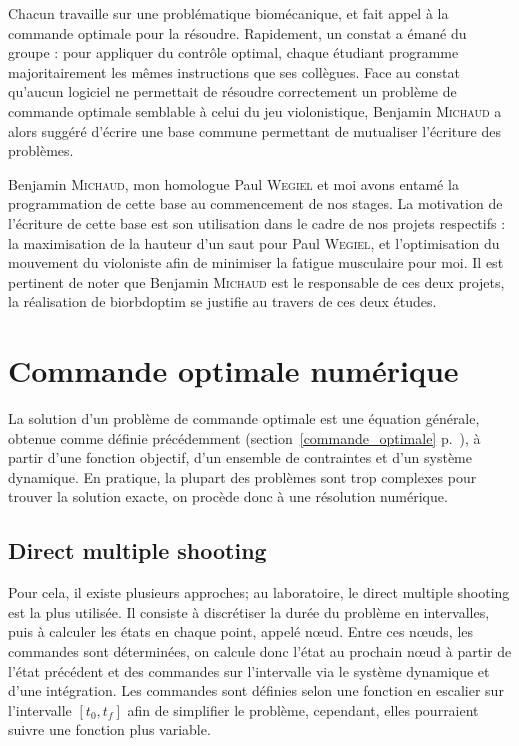 Chacun travaille sur une problématique biomécanique, et fait appel à la commande optimale pour la résoudre. Rapidement,  un constat a émané du groupe : pour appliquer du contrôle optimal, chaque étudiant programme majoritairement les mêmes instructions que ses collègues.
Face au constat qu'aucun logiciel ne permettait de résoudre correctement un problème de commande optimale semblable à celui du jeu violonistique, Benjamin \textsc{Michaud} a alors suggéré d'écrire une base commune permettant de mutualiser l'écriture des problèmes.

Benjamin \textsc{Michaud}, mon homologue Paul \textsc{Wegiel} et moi avons entamé la programmation de cette base au commencement de nos stages. La motivation de l'écriture de cette base est son utilisation dans le cadre de nos projets respectifs : la maximisation de la hauteur d'un saut pour Paul \textsc{Wegiel}, et l'optimisation du mouvement du violoniste afin de minimiser la fatigue musculaire pour moi. Il est pertinent de noter que Benjamin \textsc{Michaud} est le responsable de ces deux projets, la réalisation de \gls{biorbdoptim} se justifie au travers de ces deux études.

        
        
        \section{Commande optimale numérique}        
    
La solution d’un problème de commande optimale est une équation générale, obtenue comme définie précédemment (section~\ref{commande_optimale} p.~\pageref{commande_optimale}), à partir d'une fonction objectif, d'un ensemble de contraintes et d'un système dynamique. En pratique, la plupart des problèmes sont trop complexes pour trouver la solution exacte, on procède donc à une résolution numérique.

            \subsection{Direct multiple shooting}

Pour cela, il existe plusieurs approches; au laboratoire, le direct multiple shooting est la plus utilisée. Il consiste à discrétiser la durée du problème en intervalles, puis à calculer les états en chaque point, appelé nœud. Entre ces nœuds, les commandes sont déterminées, on calcule donc l’état au prochain nœud à partir de l’état précédent et des commandes sur l’intervalle via le système dynamique et d'une intégration.
Les commandes sont définies selon une fonction en escalier sur l'intervalle $[t_{0}, t_{f}]$ afin de simplifier le problème, cependant, elles pourraient suivre une fonction plus variable.

